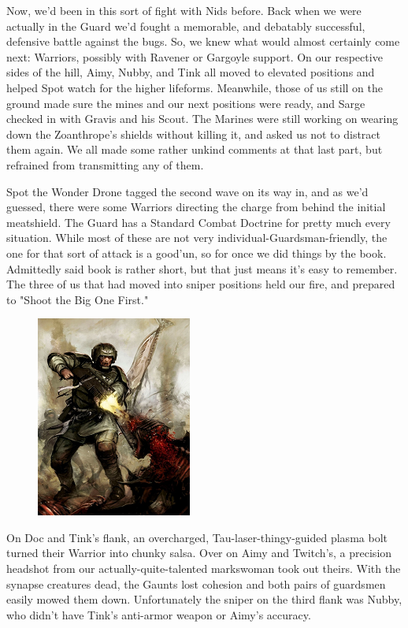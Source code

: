 Now, we'd been in this sort of fight with Nids before. 
Back when we were actually in the Guard we'd fought a memorable, and debatably successful, defensive battle against the bugs. 
So, we knew what would almost certainly come next: 
Warriors, possibly with Ravener or Gargoyle support. 
On our respective sides of the hill, Aimy, Nubby, and Tink all moved to elevated positions and helped Spot watch for the higher lifeforms. 
Meanwhile, those of us still on the ground made sure the mines and our next positions were ready, and Sarge checked in with Gravis and his Scout. 
The Marines were still working on wearing down the Zoanthrope's shields without killing it, and asked us not to distract them again. 
We all made some rather unkind comments at that last part, but refrained from transmitting any of them.

Spot the Wonder Drone tagged the second wave on its way in, and as we'd guessed, there were some Warriors directing the charge from behind the initial meatshield. 
The Guard has a Standard Combat Doctrine for pretty much every situation. 
While most of these are not very individual-Guardsman-friendly, the one for that sort of attack is a good'un, so for once we did things by the book. 
Admittedly said book is rather short, but that just means it's easy to remember. 
The three of us that had moved into sniper positions held our fire, and prepared to "Shoot the Big One First."

\begin{figure}
	\begin{center}
		\includegraphics[width=\figwidth]{pics/12/44.png}
	\end{center}
\end{figure}
On Doc and Tink's flank, an overcharged, Tau-laser-thingy-guided plasma bolt turned their Warrior into chunky salsa. 
Over on Aimy and Twitch's, a precision headshot from our actually-quite-talented markswoman took out theirs. 
With the synapse creatures dead, the Gaunts lost cohesion and both pairs of guardsmen easily mowed them down. 
Unfortunately the sniper on the third flank was Nubby, who didn't have Tink's anti-armor weapon or Aimy's accuracy.

